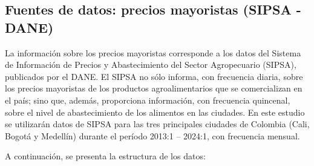 \documentclass[
  12pt,
]{article}
\begin{document}
\subsection{Fuentes de datos: precios mayoristas (SIPSA -
DANE)}\label{fuentes-de-datos-precios-mayoristas-sipsa---dane}

La información sobre los precios mayoristas corresponde a los datos del
Sistema de Información de Precios y Abastecimiento del Sector
Agropecuario (SIPSA), publicados por el DANE. El SIPSA no sólo informa,
con frecuencia diaria, sobre los precios mayoristas de los productos
agroalimentarios que se comercializan en el país; sino que, además,
proporciona información, con frecuencia quincenal, sobre el nivel de
abastecimiento de los alimentos en las ciudades. En este estudio se
utilizarán datos de SIPSA para las tres principales ciudades de Colombia
(Cali, Bogotá y Medellín) durante el período 2013:1 -- 2024:1, con
frecuencia mensual.

A continuación, se presenta la estructura de los datos:
\end{document}
